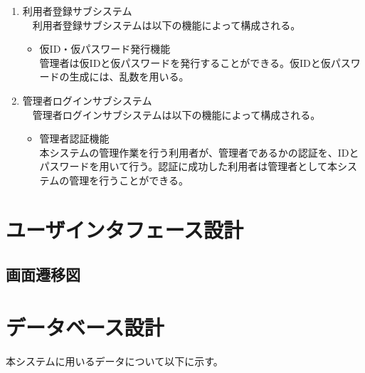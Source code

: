 \documentclass[a4j]{jarticle}
\begin{document}
\begin{enumerate}
  \item 利用者登録サブシステム\\
  　利用者登録サブシステムは以下の機能によって構成される。
  \begin{itemize}
    \item 仮ID・仮パスワード発行機能\\
    管理者は仮IDと仮パスワードを発行することができる。仮IDと仮パスワードの生成には、乱数を用いる。\\
  \end{itemize}


  \item 管理者ログインサブシステム\\
  　管理者ログインサブシステムは以下の機能によって構成される。
  \begin{itemize}
    \item 管理者認証機能\\
    本システムの管理作業を行う利用者が、管理者であるかの認証を、IDとパスワードを用いて行う。認証に成功した利用者は管理者として本システムの管理を行うことができる。
  \end{itemize}

\end{enumerate}



\section{ユーザインタフェース設計}

\subsection{画面遷移図}


\section{データベース設計}
本システムに用いるデータについて以下に示す。
\end{document}
